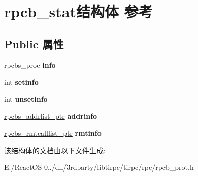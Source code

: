 \hypertarget{structrpcb__stat}{}\section{rpcb\+\_\+stat结构体 参考}
\label{structrpcb__stat}
\subsection*{Public 属性}
\begin{DoxyCompactItemize}
\item 
\mbox{\label{structrpcb__stat_a2acd5b15893c902ae1dd25d88873f682}} 
rpcbs\+\_\+proc {\bfseries info}
\item 
\mbox{\label{structrpcb__stat_a2eed2e18c6f886641c52d2e632c57299}} 
int {\bfseries setinfo}
\item 
\mbox{\label{structrpcb__stat_aa9949e8a2309ccd1fb824915e8fdb6e6}} 
int {\bfseries unsetinfo}
\item 
\mbox{\label{structrpcb__stat_ace05fca59f44db937e60d1828461d44e}} 
\hyperlink{structrpcbs__addrlist}{rpcbs\+\_\+addrlist\+\_\+ptr} {\bfseries addrinfo}
\item 
\mbox{\label{structrpcb__stat_a5bf4f573db29848e39c7e7d6a7a1c521}} 
\hyperlink{structrpcbs__rmtcalllist}{rpcbs\+\_\+rmtcalllist\+\_\+ptr} {\bfseries rmtinfo}
\end{DoxyCompactItemize}


该结构体的文档由以下文件生成\+:\begin{DoxyCompactItemize}
\item 
E\+:/\+React\+O\+S-\/0../dll/3rdparty/libtirpc/tirpc/rpc/rpcb\+\_\+prot.\+h\end{DoxyCompactItemize}
